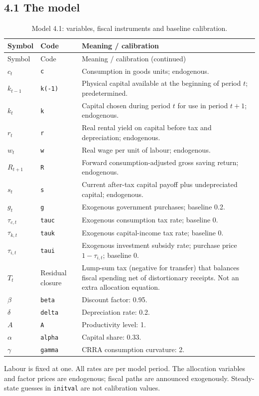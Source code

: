 \documentclass[12pt]{article}
\begin{document}
\subsection*{4.1 The model}


\begingroup
\small
\captionsetup{labelformat=empty}
\begin{longtable}{p{}p{}p{}}
\caption{Model 4.1: variables, fiscal instruments and baseline calibration.}\\
\hline
Symbol & Code & Meaning / calibration \\
\hline
\endfirsthead
Symbol & Code & Meaning / calibration (continued) \\
\hline
\endhead
$c_t$ & \texttt{c} & Consumption in goods units; endogenous. \\
$k_{t-1}$ & \texttt{k(-1)} & Physical capital available at the beginning of period $t$; predetermined. \\
$k_t$ & \texttt{k} & Capital chosen during period $t$ for use in period $t+1$; endogenous. \\
$r_t$ & \texttt{r} & Real rental yield on capital before tax and depreciation; endogenous. \\
$w_t$ & \texttt{w} & Real wage per unit of labour; endogenous. \\
$R_{t+1}$ & \texttt{R} & Forward consumption-adjusted gross saving return; endogenous. \\
$s_t$ & \texttt{s} & Current after-tax capital payoff plus undepreciated capital; endogenous. \\
$g_t$ & \texttt{g} & Exogenous government purchases; baseline 0.2. \\
$\tau_{c,t}$ & \texttt{tauc} & Exogenous consumption tax rate; baseline 0. \\
$\tau_{k,t}$ & \texttt{tauk} & Exogenous capital-income tax rate; baseline 0. \\
$\tau_{i,t}$ & \texttt{taui} & Exogenous investment subsidy rate; purchase price $1-\tau_{i,t}$; baseline 0. \\
$T_t$ & Residual closure & Lump-sum tax (negative for transfer) that balances fiscal spending net of distortionary receipts. Not an extra allocation equation. \\
$\beta$ & \texttt{beta} & Discount factor: 0.95. \\
$\delta$ & \texttt{delta} & Depreciation rate: 0.2. \\
$A$ & \texttt{A} & Productivity level: 1. \\
$\alpha$ & \texttt{alpha} & Capital share: 0.33. \\
$\gamma$ & \texttt{gamma} & CRRA consumption curvature: 2. \\
\hline
\end{longtable}
\noindent Labour is fixed at one. All rates are per model period. The allocation variables and factor prices are endogenous; fiscal paths are announced exogenously. Steady-state guesses in \texttt{initval} are not calibration values.
\endgroup
\end{document}
